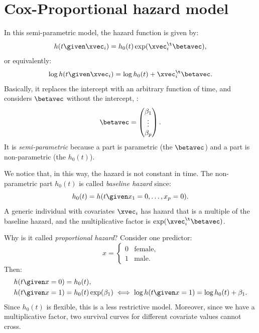 \section{Cox-Proportional hazard model}

In this semi-parametric model, the hazard function is given by:
\begin{equation}
    h(t\given \xvec_i) = h_0(t) \exp(\xvec_i^\t \betavec),
\end{equation}
or equivalently:
\begin{equation}
    \log h(t \given \xvec_i) = \log h_0(t) + \xvec_i^\t \betavec.
\end{equation}
Basically, it replaces the intercept with an arbitrary function of time, and considers $\betavec$ without the intercept, \ie:
\begin{equation}
    \betavec = \begin{pmatrix}
        \beta_1 \\
        \vdots  \\
        \beta_p
    \end{pmatrix}.
\end{equation}
It is \emph{semi-parametric} because a part is parametric (the $\betavec$) and a part is non-parametric (the $h_0(t)$).

We notice that, in this way, the hazard is not constant in time. The non-parametric part $h_0(t)$ is called \emph{baseline hazard} since:
\begin{equation}
    h_0(t) = h(t \given x_1 = 0, \dots, x_p = 0).
\end{equation}
A generic individual with covariates $\xvec_i$ has hazard that is a multiple of the baseline hazard, and the multiplicative factor is $\exp(\xvec_i^\t\betavec)$.

\begin{note}
    Why is it called \emph{proportional hazard}? Consider one predictor:
    \begin{equation}
        x = \begin{cases}
            0 & \text{female}, \\
            1 & \text{male}.
        \end{cases}
    \end{equation}
    Then:
    \begin{equation}
        \begin{aligned}
            h(t \given x = 0) & = h_0(t),                                                                   \\
            h(t \given x = 1) & = h_0(t) \exp(\beta_1) \iff \log h(t \given x = 1) = \log h_0(t) + \beta_1.
        \end{aligned}
    \end{equation}
    Since $h_0(t)$ is flexible, this is a less restrictive model. Moreover, since we have a multiplicative factor, two survival curves for different covariate values cannot cross.
\end{note}

